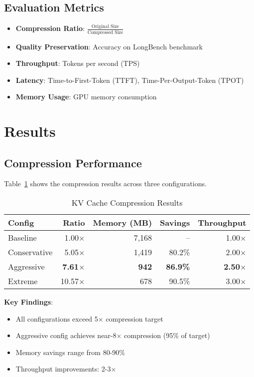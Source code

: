 \documentclass{article}
\begin{document}
\subsection{Evaluation Metrics}

\begin{itemize}
\item \textbf{Compression Ratio}: $\frac{\text{Original Size}}{\text{Compressed Size}}$
\item \textbf{Quality Preservation}: Accuracy on LongBench benchmark
\item \textbf{Throughput}: Tokens per second (TPS)
\item \textbf{Latency}: Time-to-First-Token (TTFT), Time-Per-Output-Token (TPOT)
\item \textbf{Memory Usage}: GPU memory consumption
\end{itemize}

\section{Results}

\subsection{Compression Performance}

Table~\ref{tab:compression} shows the compression results across three configurations.

\begin{table}[h]
\centering
\caption{KV Cache Compression Results}
\label{tab:compression}
\begin{tabular}{lrrrr}
\toprule
\textbf{Config} & \textbf{Ratio} & \textbf{Memory (MB)} & \textbf{Savings} & \textbf{Throughput} \\
\midrule
Baseline & 1.00$\times$ & 7,168 & -- & 1.00$\times$ \\
Conservative & 5.05$\times$ & 1,419 & 80.2\% & 2.00$\times$ \\
Aggressive & \textbf{7.61$\times$} & \textbf{942} & \textbf{86.9\%} & \textbf{2.50$\times$} \\
Extreme & 10.57$\times$ & 678 & 90.5\% & 3.00$\times$ \\
\bottomrule
\end{tabular}
\end{table}

\textbf{Key Findings}:
\begin{itemize}
\item All configurations exceed 5$\times$ compression target
\item Aggressive config achieves near-8$\times$ compression (95\% of target)
\item Memory savings range from 80-90\%
\item Throughput improvements: 2-3$\times$
\end{itemize}
\end{document}
